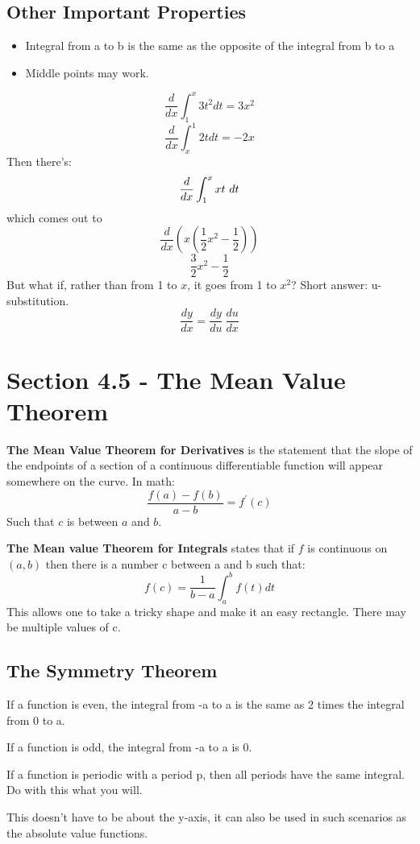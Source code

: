 \documentclass[11pt]{article}
\begin{document}
    \subsection{Other Important Properties}
    \begin{itemize}
      \item Integral from a to b is the same as the opposite of the integral from
        b to a
      \item Middle points may work.
    \end{itemize}
    \[
        \frac{d}{dx} \int_{1}^{x}3t^2dt = 3x^2
    \]
    \[
        \frac{d}{dx}\int_{x}^{1}2tdt = -2x
    \]
    Then there's:
    \[
        \frac{d}{dx}\int_{1}^{x}xt\ dt \\
    \]
    which comes out to
    \[
        \frac{d}{dx}\left(x\left(\frac{1}{2} x^2 - \frac{1}{2}\right)\right)
    \]
    \[
        \frac{3}{2}x^2-\frac{1}{2}
    \]
    But what if, rather than from 1 to $x$, it goes from 1 to $x^2$?  Short
    answer: u-substitution.
    \[
        \frac{dy}{dx} = \frac{dy}{du}\  \frac{du}{dx}
    \]
\section{Section 4.5 - The Mean Value Theorem}
    {\bf The Mean Value Theorem for Derivatives} is the statement that the slope
    of the endpoints of a section of a continuous differentiable function will
    appear somewhere on the curve.  In math:
    \[
        \frac{f(a)-f(b)}{a-b} = f^\prime (c)
    \]
    Such that $c$ is between $a$ and $b$.

    {\bf The Mean value Theorem for Integrals} states that if $f$ is continuous on
    $(a, b)$ then there is a number c between a and b such that:
    \[
        f(c) = \frac{1}{b-a} \int _a ^b f(t)dt
    \]
    This allows one to take a tricky shape and make it an easy rectangle.  There
    may be multiple values of c.

\subsection{The Symmetry Theorem}
    If a function is even, the integral from -a to a is the same as 2 times the
    integral from 0 to a.

    If a function is odd, the integral from -a to a is 0.

    If a function is periodic with a period p, then all periods have the same
    integral.  Do with this what you will.

    This doesn't have to be about the y-axis, it can also be used in such scenarios
    as the absolute value functions.
    
\end{document}
